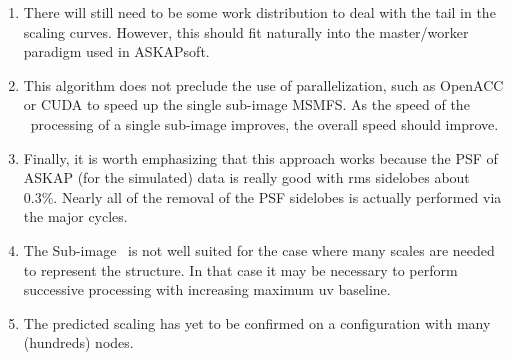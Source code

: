 \documentclass[11pt,a4paper,variablewidth]{article}
\begin{document}
\begin{enumerate}
	\item There will still need to be some work distribution to deal with the tail in the scaling curves. However, this should fit naturally into the master/worker paradigm used in ASKAPsoft.
	\item This algorithm does not preclude the use of parallelization, such as OpenACC or CUDA to speed up the single sub-image MSMFS. As the speed of the \MAM\ processing of a single sub-image improves, the overall speed should improve.
	\item Finally, it is worth emphasizing that this approach works because the PSF of ASKAP (for the simulated) data is really good with rms sidelobes about 0.3\%. Nearly all of the removal of the PSF sidelobes is actually performed via the major cycles.
	\item The Sub-image \MAM\ is not well suited for the case where many scales are needed to represent the structure. In that case it may be necessary to perform successive processing with increasing maximum uv baseline.
	\item The predicted scaling has yet to be confirmed on a configuration with many (hundreds) nodes.
\end{enumerate}
\end{document}
